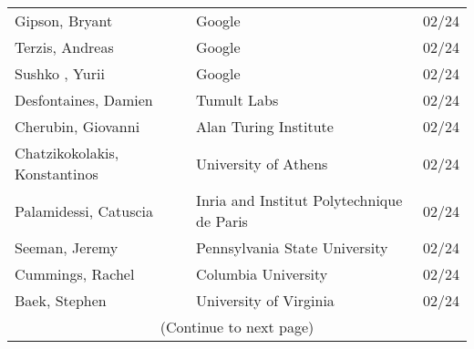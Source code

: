 \documentclass[localFont,alternative]{documentMETADATA}
\begin{document}
\begin{tabular}{lll}
	 Gipson, Bryant & Google 	& 02/24\\
	 Terzis, Andreas & Google  	& 02/24\\
	 Sushko , Yurii & Google  	& 02/24\\
	 Desfontaines, Damien & Tumult Labs  	& 02/24\\
	 Cherubin, Giovanni & Alan Turing Institute 	& 02/24\\
	 Chatzikokolakis, Konstantinos & University of Athens 	& 02/24\\
	 Palamidessi, Catuscia & Inria and Institut Polytechnique de Paris 	& 02/24\\
	 Seeman, Jeremy & Pennsylvania State University 	& 02/24\\
    Cummings, Rachel & Columbia University 	& 02/24\\
		Baek, Stephen						& University of Virginia						  & 02/24 \\[12pt]
		\multicolumn{3}{c}{(Continue to next page)}\\
	 \bottomrule
\end{tabular}
\end{document}
